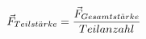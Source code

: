 \documentclass[preview]{standalone}
\begin{document}
\begin{align*}
\special{dvisvgm:raw <g id='unique000'>}\vec{F}_{Teilst \ddot{a} rke} = \frac{\vec{F}_{Gesamtst \ddot{a} rke}} {Teilanzahl}\special{dvisvgm:raw </g>}
\end{align*}
\end{document}
